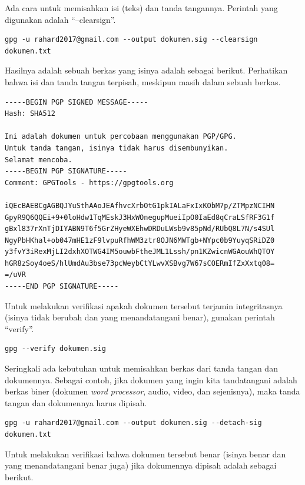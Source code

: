 Ada cara untuk memisahkan isi (teks) dan tanda tangannya. Perintah yang
digunakan adalah ``--clearsign''.
\begin{verbatim}
gpg -u rahard2017@gmail.com --output dokumen.sig --clearsign dokumen.txt
\end{verbatim}

Hasilnya adalah sebuah berkas yang isinya adalah sebagai berikut. Perhatikan
bahwa isi dan tanda tangan terpisah, meskipun masih dalam sebuah berkas.

\begin{mdframed}[backgroundcolor=red!20]
\begin{verbatim}
-----BEGIN PGP SIGNED MESSAGE-----
Hash: SHA512

Ini adalah dokumen untuk percobaan menggunakan PGP/GPG.
Untuk tanda tangan, isinya tidak harus disembunyikan.
Selamat mencoba.
-----BEGIN PGP SIGNATURE-----
Comment: GPGTools - https://gpgtools.org

iQEcBAEBCgAGBQJYuSthAAoJEAfhvcXrbOtG1pkIALaFxIxKObM7p/ZTMpzNCIHN
GpyR9Q6QQEi+9+0loHdw1TqMEskJ3HxWOnegupMueiIpO0IaEd8qCraLSfRF3G1f
gBxl837rXnTjDIYABN9T6f5GrZHyeWXEhwDRDuLWsb9v85pNd/RUbQ8L7N/s4SUl
NgyPbHKhal+ob047mHE1zF9lvpuRfhWM3ztr8OJN6MWTgb+NYpc0b9YuyqSRiDZ0
y3fvY3iRexMjLI2dxhXOTWG4IM5ouwbFtheJML1Lssh/pn1KZwicnWGAouWhQTOY
hGR8zSoy4oeS/hlUmdAu3bse73pcWeybCtYLwvXSBvg7W67sCOERmIfZxXxtq08=
=/uVR
-----END PGP SIGNATURE-----
\end{verbatim}
\end{mdframed}

Untuk melakukan verifikasi apakah dokumen tersebut terjamin integritasnya
(isinya tidak berubah dan yang menandatangani benar), gunakan perintah
``verify''.

\begin{mdframed}
\begin{verbatim}
gpg --verify dokumen.sig
\end{verbatim}
\end{mdframed}


Seringkali ada kebutuhan untuk memisahkan berkas dari tanda tangan dan
dokumennya. Sebagai contoh, jika dokumen yang ingin kita tandatangani adalah berkas
biner (dokumen {\em word processor}, audio, video, dan sejenisnya), maka tanda
tangan dan dokumennya harus dipisah.

\begin{verbatim}
gpg -u rahard2017@gmail.com --output dokumen.sig --detach-sig dokumen.txt
\end{verbatim}

Untuk melakukan verifikasi bahwa dokumen tersebut benar (isinya benar dan yang
menandatangani benar juga) jika dokumennya dipisah adalah sebagai berikut.


